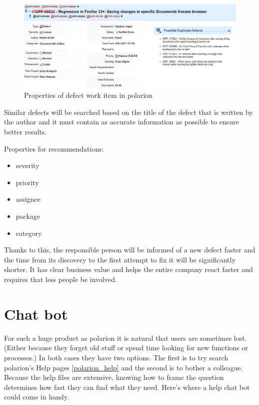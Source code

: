 \documentclass[thesis=M,english]{FITthesis}[2012/06/26]
\begin{document}
\begin{figure}[h!]\centering
	\includegraphics[width=1\textwidth]{pictures/defect_menu}
	\caption{Properties of defect work item  in \acrshort{polarion}}\label{fig:defect_menu}
\end{figure}

Similar defects will be searched based on the title of the defect that is written by the author and it must contain as accurate  information as possible to ensure better results. \\

\pagebreak

Properties for recommendations:
\begin{itemize}[nosep]
\item severity
\item priority
\item assignee
\item package
\item category\\
\end{itemize}

Thanks to this, the responsible person will be informed of a new defect faster and the time from its discovery to the first attempt to fix it will be significantly shorter. It has clear business value and helps the entire company react faster and requires that less people be involved.

\section{Chat bot}

For such a huge product as \acrshort{polarion} it is natural that users are sometimes lost. (Either because they forget old stuff or spend time looking for new functions or processes.) In both cases they have two options. The first is to try search \acrshort{polarion}'s Help pages \ref{polarion_help} and the second is to bother a colleague. Because the help files are extensive, knowing how to frame the question determines how fast they can find what they need. Here's where a help chat bot could come in handy.\\
\end{document}
